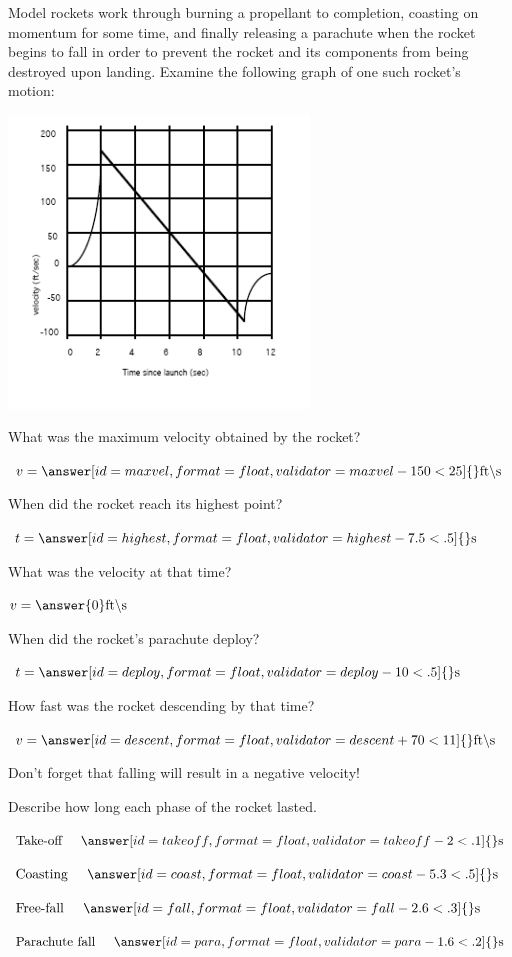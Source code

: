 \documentclass{ximera}
\begin{document}
\begin{question}
Model rockets work through burning a propellant to completion, coasting on momentum for some time, and finally releasing a parachute when the rocket begins to fall in order to prevent the rocket and its components from being destroyed upon landing. Examine the following graph of one such rocket's motion:
\begin{image}
    \includegraphics[width=80mm]{rocket.png}
\end{image}

What was the maximum velocity obtained by the rocket?

$v = \answer[id=maxvel,format=float,validator=maxvel-150<25]{} \text{ft}\backslash \text{s}$

When did the rocket reach its highest point?

$t = \answer[id=highest,format=float,validator=highest-7.5<.5]{} \text{s}$

What was the velocity at that time?

$v = \answer{0} \text{ft} \backslash \text{s}$

When did the rocket's parachute deploy?

$t = \answer[id=deploy,format=float,validator=deploy-10<.5]{} \text{s}$

How fast was the rocket descending by that time?

$v = \answer[id=descent,format=float,validator=descent+70<11]{} \text{ft} \backslash \text{s}$
\begin{feedback}[wrong]
Don't forget that falling will result in a negative velocity!
\end{feedback}

Describe how long each phase of the rocket lasted.

$\text{Take-off} \hspace{5mm} \answer[id=takeoff,format=float,validator=takeoff-2<.1]{} \text{s}$

$\text{Coasting} \hspace{5mm} \answer[id=coast,format=float,validator=coast-5.3<.5]{} \text{s}$

$\text{Free-fall} \hspace{5mm} \answer[id=fall,format=float,validator=fall-2.6<.3]{} \text{s}$

$\text{Parachute fall} \hspace{5mm} \answer[id=para,format=float,validator=para-1.6<.2]{} \text{s}$
\end{question}
\end{document}
